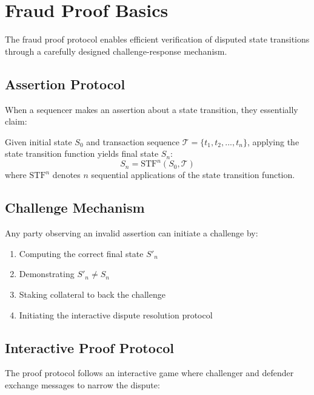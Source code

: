 \section{Fraud Proof Basics}


The fraud proof protocol enables efficient verification of disputed state transitions through a carefully designed challenge-response mechanism.

\subsection{Assertion Protocol}

When a sequencer makes an assertion about a state transition, they essentially claim:

\begin{proposition}
Given initial state $S_0$ and transaction sequence $\mathcal{T} = \{t_1, t_2, ..., t_n\}$, applying the state transition function yields final state $S_n$:
\begin{equation}
S_n = \text{STF}^n(S_0, \mathcal{T})
\end{equation}
where $\text{STF}^n$ denotes $n$ sequential applications of the state transition function.
\end{proposition}

\subsection{Challenge Mechanism}

Any party observing an invalid assertion can initiate a challenge by:

\begin{enumerate}
    \item Computing the correct final state $S'_n$
    \item Demonstrating $S'_n \neq S_n$
    \item Staking collateral to back the challenge
    \item Initiating the interactive dispute resolution protocol
\end{enumerate}

\subsection{Interactive Proof Protocol}

The proof protocol follows an interactive game where challenger and defender exchange messages to narrow the dispute:


